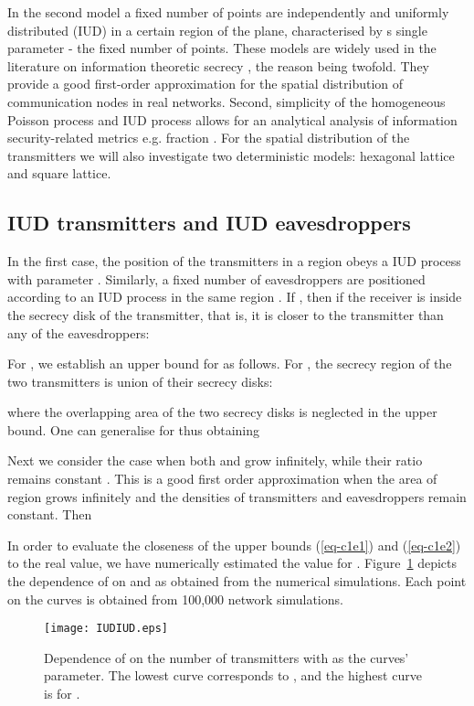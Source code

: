 \documentclass[conference,a4paper]{IEEEtran}
\begin{document}
In the second model a fixed number of points are independently and uniformly distributed (IUD) in a certain region of the plane, characterised by s single parameter - the fixed number of points. 
These models are widely used in the literature on information theoretic secrecy \cite{SarkarHaenggi-2010,SarkarHaenggi2011,Pinto2009}, the reason being twofold.
They provide a good first-order approximation for the spatial distribution of communication nodes in real networks.
Second, simplicity of the homogeneous Poisson process and IUD process allows for an analytical analysis of information security-related metrics e.g. fraction .
For the spatial distribution of the transmitters we will also investigate two deterministic models: hexagonal lattice and square lattice.

















\subsection{IUD transmitters and IUD eavesdroppers}\label{sec-IUDTxIUDE}
In the first case, the position of the transmitters in a region  obeys a IUD process with parameter . Similarly, a fixed number of eavesdroppers  are positioned according to an IUD process in the same region .
If , then  if the receiver is inside the secrecy disk of the transmitter, that is, it is closer to the transmitter than any of the  eavesdroppers:


For , we establish an upper bound for  as follows.
For , the secrecy region of the two transmitters is union of their secrecy disks:

where the overlapping area of the two secrecy disks is neglected in the upper bound.
One can generalise for  thus obtaining


Next we consider the case when both  and  grow infinitely, while their ratio remains constant . 
This is a good first order approximation when the area of region  grows infinitely and the densities of transmitters and eavesdroppers remain constant.
Then


In order to evaluate the closeness of the upper bounds (\ref{eq-c1e1}) and (\ref{eq-c1e2}) to the real value,
we have numerically estimated the value for .
Figure~\ref{fig-CsvsnTIUDIUD} depicts the dependence of  on  and  as obtained from the numerical simulations.
Each point on the curves is obtained from 100,000 network simulations.
\begin{figure}[htbp]
\centering
\texttt{[image: IUDIUD.eps]}
\caption{Dependence of  on the number of transmitters  with  as the curves' parameter.
The lowest curve corresponds to , and the highest curve is for .}
\label{fig-CsvsnTIUDIUD}
\end{figure}
\end{document}
